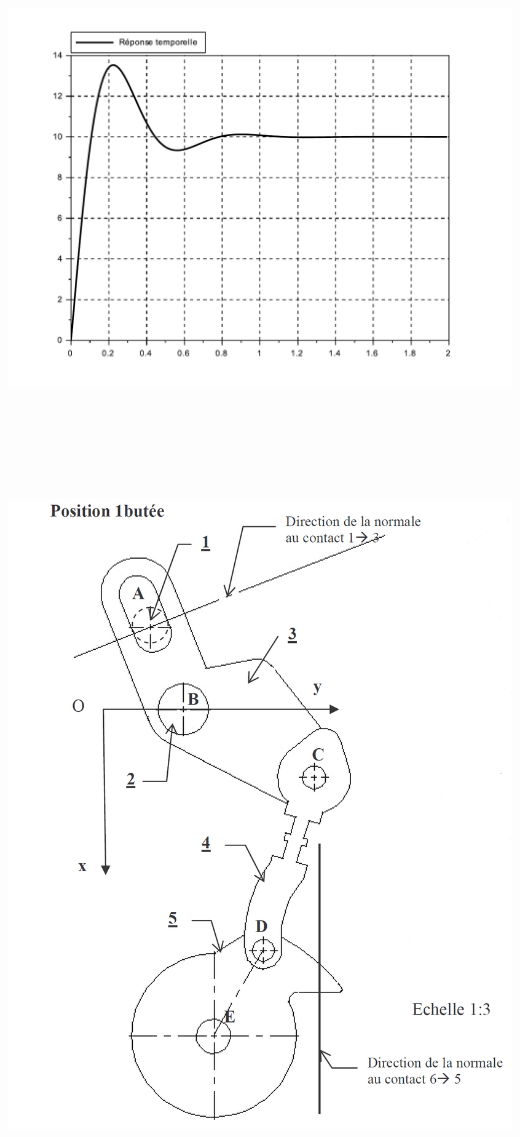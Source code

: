~\ \\ ~\ \\

\newpage


\begin{center}
 \includegraphics[width=\linewidth]{img/q19}
\end{center}

~\ \\ ~\ \\ ~\ \\ ~\ \\



\newpage



\begin{center}
 \includegraphics[width=0.7\linewidth]{img/Portes15}
\end{center}

